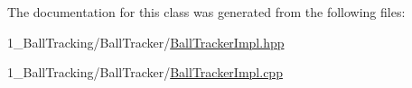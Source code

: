 The documentation for this class was generated from the following files\+:\begin{DoxyCompactItemize}
\item 
1\+\_\+\+Ball\+Tracking/\+Ball\+Tracker/\hyperlink{_ball_tracker_impl_8hpp}{Ball\+Tracker\+Impl.\+hpp}\item 
1\+\_\+\+Ball\+Tracking/\+Ball\+Tracker/\hyperlink{_ball_tracker_impl_8cpp}{Ball\+Tracker\+Impl.\+cpp}\end{DoxyCompactItemize}

